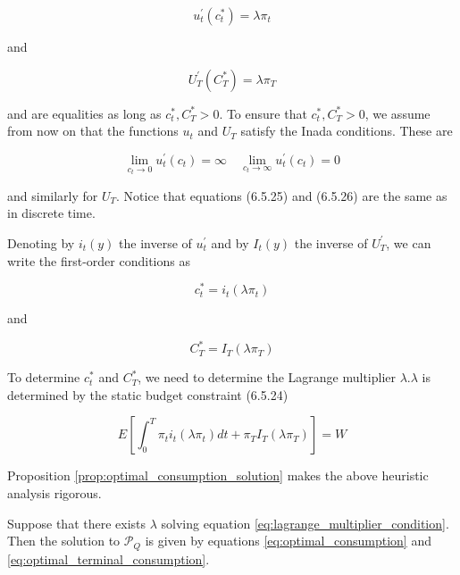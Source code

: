 \documentclass[\topdir/lecture\_notes.tex]{subfiles}
\begin{document}
\begin{equation}
u_{t}^{\prime}\left(c_{t}^{*}\right)=\lambda \pi_{t} \label{eq:6.5.25}
\end{equation}

and

\begin{equation}
U_{T}^{\prime}\left(C_{T}^{*}\right)=\lambda \pi_{T} \label{eq:6.5.26}
\end{equation}

and are equalities as long as \(c_{t}^{*}, C_{T}^{*}>0\). To ensure that \(c_{t}^{*}, C_{T}^{*}>0\), we assume from now on that the functions \(u_{t}\) and \(U_{T}\) satisfy the Inada conditions. These are

\begin{equation*}
\lim _{c_{t} \rightarrow 0} u_{t}^{\prime}\left(c_{t}\right)=\infty \quad \lim _{c_{t} \rightarrow \infty} u_{t}^{\prime}\left(c_{t}\right)=0
\end{equation*}

and similarly for \(U_{T}\). Notice that equations (6.5.25) and (6.5.26) are the same as in discrete time.

Denoting by \(i_{t}(y)\) the inverse of \(u_{t}^{\prime}\) and by \(I_{t}(y)\) the inverse of \(U_{T}^{\prime}\), we can write the first-order conditions as

\begin{equation}
c_{t}^{*}=i_{t}\left(\lambda \pi_{t}\right) \label{eq:optimal_consumption}
\end{equation}

and

\begin{equation}
C_{T}^{*}=I_{T}\left(\lambda \pi_{T}\right) \label{eq:optimal_terminal_consumption}
\end{equation}

To determine \(c_{t}^{*}\) and \(C_{T}^{*}\), we need to determine the Lagrange multiplier \(\lambda . \lambda\) is determined by the static budget constraint (6.5.24)

\begin{equation}
E\left[\int_{0}^{T} \pi_{t} i_{t}\left(\lambda \pi_{t}\right) d t+\pi_{T} I_{T}\left(\lambda \pi_{T}\right)\right]=W \label{eq:lagrange_multiplier_condition}
\end{equation}

Proposition \ref{prop:optimal_consumption_solution} makes the above heuristic analysis rigorous.

\begin{proposition}\label{prop:optimal_consumption_solution}
Suppose that there exists \(\lambda\) solving equation \eqref{eq:lagrange_multiplier_condition}. Then the solution to \(\mathcal{P}_{Q}\) is given by equations \eqref{eq:optimal_consumption} and \eqref{eq:optimal_terminal_consumption}.
\end{proposition}
\end{document}
